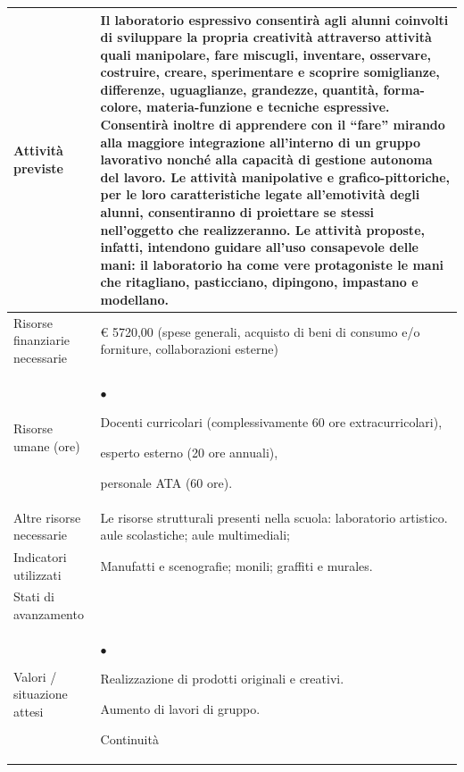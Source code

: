 \documentclass[12pt,a4paper,oneside]{memoir}
\newenvironment{elenco}{\begin{list}{$\bullet$}{%
              \setlength{\leftmargin}{4mm}%
              \setlength{\rightmargin}{1mm}%
               \setlength{\itemindent}{0mm}%
               \setlength{\labelwidth}{2mm}%
               \setlength{\labelsep}{2mm}%
              \setlength{\itemsep}{-\parsep}%
              \setlength{\partopsep}{0pt}%
              \setlength{\topsep}{0pt}%
             \setlength{\parskip}{0pt}%
              }}{\end{list}}
\begin{document}
\begin{footnotesize}
\begin{longtable}{|>{\raggedright}p{2.5cm}|>{\raggedright\arraybackslash}P{10cm}|}
Attività previste &Il laboratorio espressivo consentirà agli alunni coinvolti di sviluppare la propria creatività attraverso attività quali manipolare, fare miscugli, inventare, osservare, costruire, creare, sperimentare e scoprire somiglianze, differenze, uguaglianze, grandezze, quantità, forma-colore, materia-funzione e tecniche espressive. Consentirà inoltre di apprendere con il “fare” mirando alla maggiore integrazione all'interno di un gruppo lavorativo nonché alla capacità di gestione autonoma del lavoro. Le attività manipolative e grafico-pittoriche, per le loro caratteristiche legate all'emotività degli alunni, consentiranno di proiettare se stessi nell'oggetto che realizzeranno. Le attività proposte, infatti, intendono guidare all'uso consapevole delle mani: il laboratorio ha come vere protagoniste le mani che ritagliano, pasticciano, dipingono, impastano e modellano.\\ \hline
Risorse finanziarie necessarie &€ 5720,00 (spese generali, acquisto di beni di consumo e/o forniture, collaborazioni esterne)\\ \hline
Risorse umane (ore)&
\begin{elenco}
\item Docenti curricolari (complessivamente 60 ore extracurricolari),
\item esperto esterno (20 ore annuali),
\item personale ATA (60 ore).
\end{elenco}\\[-4mm] \hline
Altre risorse necessarie &Le risorse strutturali presenti nella scuola: laboratorio artistico. aule scolastiche; aule multimediali;\\ \hline
Indicatori utilizzati &Manufatti e scenografie; monili; graffiti e murales.\\ \hline
Stati di avanzamento&\\ \hline
Valori / situazione attesi &\begin{elenco}
\item Realizzazione di prodotti originali e creativi.
\item Aumento di lavori di gruppo.
\item Continuità
\end{elenco}\\ \hline
\end{longtable}
\end{footnotesize}

\vspace{24pt}
\end{document}
